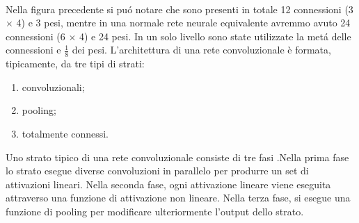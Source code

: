 \documentclass[a4paper,12pt,oneside]{book}
\begin{document}
\\Nella figura precedente si pu\'{o} notare che sono presenti in totale 12 connessioni (3$\times$ 4) e 3 pesi, mentre in una normale rete neurale equivalente avremmo avuto 24 connessioni (6 $\times$ 4) e 24 pesi. In un solo livello sono state utilizzate la met\'{a} delle connessioni e $\frac{1}{8}$ dei pesi.
\newpage
L'architettura di una rete convoluzionale \`e formata, tipicamente, da tre tipi di strati:
\begin{enumerate}
\item convoluzionali;
\item pooling;
\item totalmente connessi.
\end{enumerate}
Uno strato tipico di una rete convoluzionale consiste di tre fasi .Nella prima fase lo strato esegue diverse convoluzioni in parallelo per produrre un set di attivazioni lineari. Nella seconda fase, ogni attivazione lineare viene eseguita attraverso una funzione di attivazione non lineare. Nella terza fase, si esegue  una funzione di  pooling per modificare ulteriormente l'output dello strato.
\end{document}
